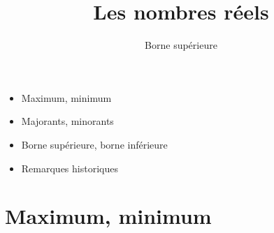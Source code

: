 










\title{{\bf Les nombres réels}}
\subtitle{Borne supérieure}

\begin{frame}

  \debutmontitre

  \pause

{\footnotesize
\hfill
{}
\begin{minipage}{0.6\textwidth}
  \begin{itemize}
    \item<3-> Maximum, minimum
    \item<4-> Majorants, minorants
    \item<5-> Borne supérieure, borne inférieure
    \item<6-> Remarques historiques
  \end{itemize}
\end{minipage}
}

\end{frame}

\setcounter{framenumber}{0}


\section*{Maximum, minimum}

